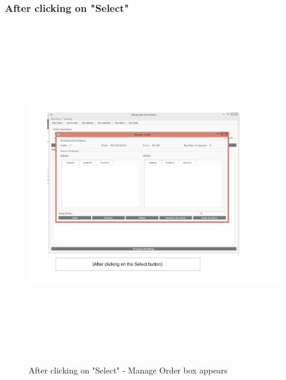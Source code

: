 \begin{landscape}
\subsubsection{After clicking on "Select"}
\begin{figure}[H]
    \includegraphics[height = 15cm]{./Maintenance/images/screen16}
    \caption{After clicking on "Select"  - Manage Order box appears} \label{fig:screen16}
\end{figure}


\end{landscape}
